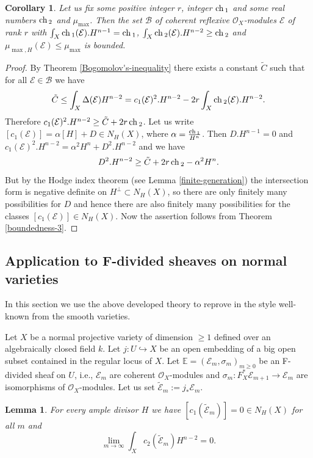 \documentclass[twoside, 11pt]{article}
\theoremstyle{plain}
\newtheorem{Corollary}[Thm]{\sc Corollary}
\newtheorem{Lemma}[Thm]{\sc Lemma}
\theoremstyle{definition}
\theoremstyle{remark}
\newcommand{\EE}{{\mathbb E}}
\newcommand{\cB}{{\mathcal B}}
\newcommand{\cE}{{\mathcal E}}
\newcommand{\cO}{{\mathcal O}}
\newcommand{\ch}{{\mathop{\rm ch \, }}}
\begin{document}
\begin{Corollary} \label{boundedness-4}
Let us fix some positive integer $r$, integer $\ch_1$ and some real
numbers $\ch _2$ and $\mu _{\max}$. 
Then the set $\cB$ of coherent reflexive $\cO_X$-modules $\cE$ of rank $r$ with $\int _X \ch_1 (\cE). H^{n-1}=\ch_1$, $\int _X \ch_2 (\cE). H^{n-2}\ge \ch_2$  and $\mu _{\max ,H } (\cE)\le \mu _{\max}$ is bounded.
\end{Corollary}

\begin{proof} 
By Theorem \ref{Bogomolov's-inequality} there exists a constant $\tilde C$ 
such that for all  $\cE \in \cB$ we have
$$\tilde C\le \int _X \Delta (\cE) H^{n-2}=  c_1 (\cE)^2.H^{n-2} - 2r \int _X \ch_2 (\cE). H^{n-2} .$$
Therefore $c_1 (\cE)^2.H^{n-2}\ge \tilde C+2r \,\ch _2$. Let us write $[c_1(\cE)]=\alpha [H]+D\in N_H (X)$, where $\alpha = \frac{\ch _1}{H^n}$.
Then $D.H^{n-1}=0$ and $c_1 (\cE)^2.H^{n-2}=\alpha ^2 H^n+D^2.H^{n-2}$ and we have
$$D^2.H^{n-2}\ge \tilde C+2r \,\ch _2 - \alpha ^2 H^n.$$
But by the Hodge index theorem (see Lemma \ref{finite-generation}) the intersection form is negative definite on $H^{\perp}\subset N_H(X)$, so there are only finitely many possibilities for $D$ and hence there are also finitely many possibilities for the classes $[c_1(\cE)]\in N_H (X)$. Now the assertion follows from Theorem \ref{boundedness-3}.
\end{proof}



\subsection{Application to F-divided sheaves on normal varieties}

In this section we use the above developed theory to reprove \cite[Theorem 2.1]{ES} in the style well-known from the smooth varieties.

\medskip

Let $X$ be a normal projective variety of dimension $\ge 1$ defined over an algebraically closed field $k$.
Let $j: U\hookrightarrow X$ be an open embedding of a big open subset contained in the regular locus of $X$.
Let $\EE= (\cE_m , \sigma _m)_{m\ge 0}$ be an F-divided sheaf on $U$, i.e., $\cE_m$ are coherent $\cO_X$-modules and $\sigma_m: F_X^* \cE_{m+1} \to \cE_m$ are isomorphisms of $\cO_X$-modules. Let us set $\tilde \cE _m:= j_*\cE_m$.


\begin{Lemma}
For every ample divisor $H$ we have  $ [c_1 (\tilde \cE _{m})]=0\in N_H(X)$ for all $m$ and $$ \lim _{m\to \infty }\int _{X}c_2 (\tilde \cE _{m})H^{n-2} =0.$$
\end{Lemma}
\end{document}
